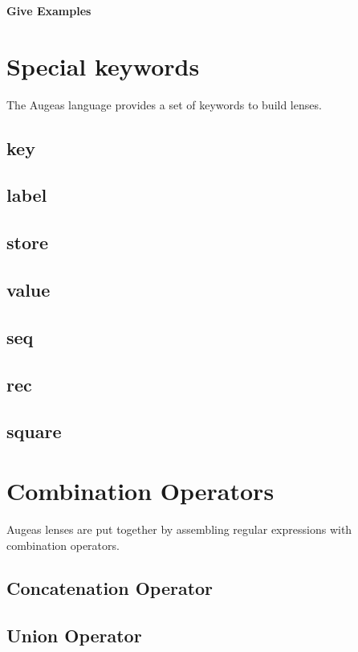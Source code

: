 \textbf{Give Examples}

\section{Special keywords}

The Augeas language provides a set of keywords to build lenses.

\subsection{key}

\subsection{label}

\subsection{store}

\subsection{value}

\subsection{seq}

\subsection{rec}

\subsection{square}

\section{Combination Operators}

Augeas lenses are put together by assembling regular expressions with combination operators.

\subsection{Concatenation Operator}

\subsection{Union Operator}

